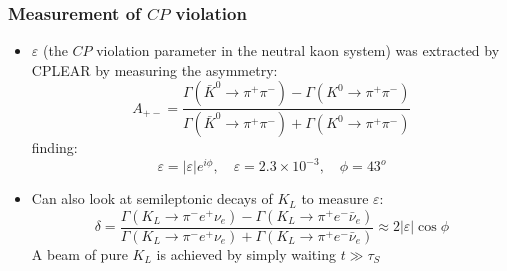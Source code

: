 \documentclass[11pt]{article}
\newcommand{\nubar}{{\bar{\nu}}}
\newcommand{\CP}{\ensuremath{CP}\xspace}
\begin{document}
\subsubsection{Measurement of \CP violation}
\begin{itemize}
  \item $\varepsilon$ (the \CP violation parameter in the neutral kaon system) was extracted by CPLEAR by measuring the asymmetry:
  \begin{equation}
    A_{+-} = \frac{\Gamma(\bar K^0 \rightarrow \pi^+\pi^-)-\Gamma(K^0 \rightarrow \pi^+\pi^-)}{\Gamma(\bar K^0 \rightarrow \pi^+\pi^-)+\Gamma(K^0 \rightarrow \pi^+\pi^-)}
  \end{equation}
  finding:
  \begin{equation}
    \varepsilon = |\varepsilon|e^{i\phi}, \quad \varepsilon = 2.3 \times 10^{-3}, \quad \phi = 43^o
  \end{equation}
  \item Can also look at semileptonic decays of $K_L$ to measure $\varepsilon$:
  \begin{equation}
    \delta = \frac{\Gamma(K_L \rightarrow \pi^-e^+\nu_e)-\Gamma(K_L \rightarrow \pi^+e^-\nubar_e)}{\Gamma(K_L \rightarrow \pi^-e^+\nu_e)+\Gamma(K_L \rightarrow \pi^+e^-\nubar_e)}  \approx 2|\varepsilon|\cos\phi
  \end{equation}
  A beam of pure $K_L$ is achieved by simply waiting $t\gg \tau_S$
\end{itemize}
\end{document}
